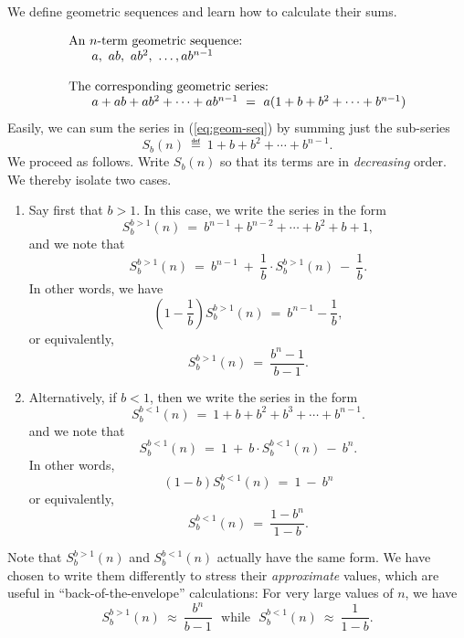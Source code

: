 \documentclass{article}
\begin{document}
We define geometric sequences and learn how to calculate their sums.

\begin{equation}
\label{eq:geom-seq}
\begin{array}{l}
\mbox{An $n$-term geometric sequence:} \\
\hspace*{.25in}a, \ ab, \ ab^2, \ \ldots, ab^{n-1} \\
\\
\mbox{The corresponding geometric series:} \\
\hspace*{.25in}a + ab + ab^2 + \cdots + ab^{n-1} \ = \
 a (1+ b + b^2 + \cdots + b^{n-1})
\end{array}
\end{equation}
Easily, we can sum the series in (\ref{eq:geom-seq}) by summing just
the sub-series
\begin{equation}
\label{eq:geom-series}
S_{b}(n) \ \eqdef \
1+ b + b^2 + \cdots + b^{n-1}.
\end{equation}
We proceed as follows.  Write $S_{b}(n)$ so that its terms are in {\em
  decreasing} order.  We thereby isolate two cases.
\begin{enumerate}
\item
Say first that $b > 1$.  In this case, we write the series in the form
\[ S^{b>1}_{b}(n) \ = \ b^{n-1} + b^{n-2} + \cdots + b^2 + b + 1, \]
and we note that
\[ S^{b>1}_{b}(n) \ = \
b^{n-1} \ + \ \frac{1}{b} \cdot S^{b>1}_{b}(n) \ - \ \frac{1}{b}. \]
In other words, we have
\[ \left( 1 - \frac{1}{b} \right)  S^{b>1}_{b}(n) \ = \ b^{n-1} -
\frac{1}{b}, \]
or equivalently,
\begin{equation}
\label{eq:geom-sum:b>1}
S^{b>1}_{b}(n) \ = \ \frac{b^{n}- 1}{b - 1}.
\end{equation}

\item
Alternatively, if $b < 1$, then we write the series in the form
\[ S^{b<1}_{b}(n) \ = \ 1+ b + b^2 + b^3 + \cdots + b^{n-1}. \]
and we note that
\[ S^{b<1}_{b}(n) \ = \
1 \ + \ b \cdot S^{b<1}_{b}(n) \ - \ b^n. \] 
In other words,
\[ (1-b) S^{b<1}_{b}(n) \ = \ 1 \ - \ b^n \]
or equivalently,
\begin{equation}
\label{eq:geom-sum:b<1}
S^{b<1}_{b}(n) \ = \ \frac{1 - b^n}{1-b}.
\end{equation}
\end{enumerate}

Note that $S^{b>1}_{b}(n)$ and $S^{b<1}_{b}(n)$ actually have the same
form.  We have chosen to write them differently to stress their {\em
  approximate} values, which are useful in ``back-of-the-envelope''
calculations:  For very large values of $n$, we have
\begin{equation}
\label{eq:geom-sum:approx}
S^{b>1}_{b}(n) \ \approx \ \frac{b^n}{b-1} \ \ \
\mbox{while} \ \ \
S^{b<1}_{b}(n) \ \approx \ \frac{1}{1-b} .
\end{equation}
\end{document}
